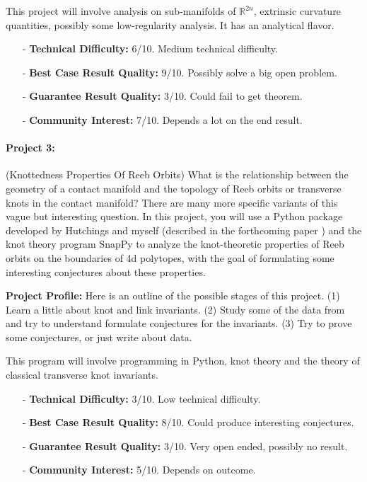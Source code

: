 \documentclass[12pt]{article}
\numberwithin{equation}{section}
\theoremstyle{definition}
\newcommand{\R}{{\mathbb R}}
\begin{document}
This project will involve analysis on sub-manifolds of $\R^{2n}$, extrinsic curvature quantities, possibly some low-regularity analysis. It has an analytical flavor.

\begin{itemize}
	\item[-] {\bf Technical Difficulty:} 6/10. Medium technical difficulty.
	\item[-] {\bf Best Case Result Quality:} 9/10. Possibly solve a big open problem.
	\item[-] {\bf Guarantee Result Quality:} 3/10. Could fail to get theorem.
	\item[-] {\bf Community Interest:} 7/10. Depends a lot on the end result.
\end{itemize}

\paragraph{Project 3:} (Knottedness Properties Of Reeb Orbits) What is the relationship between the geometry of a contact manifold and the topology of Reeb orbits or transverse knots in the contact manifold? There are many more specific variants of this vague but interesting question. In this project, you will use a Python package developed by Hutchings and myself (described in the forthcoming paper \cite{ch2018}) and the knot theory program SnapPy to analyze the knot-theoretic properties of Reeb orbits on the boundaries of 4d polytopes, with the goal of formulating some interesting conjectures about these properties.

{\bf Project Profile:} Here is an outline of the possible stages of this project. (1) Learn a little about knot and link invariants. (2) Study some of the data from \cite{ch2018} and try to understand formulate conjectures for the invariants. (3) Try to prove some conjectures, or just write about data.

This program will involve programming in Python, knot theory and the theory of classical transverse knot invariants. 

\begin{itemize}
	\item[-] {\bf Technical Difficulty:} 3/10. Low technical difficulty.
	\item[-] {\bf Best Case Result Quality:} 8/10. Could produce interesting conjectures.
	\item[-] {\bf Guarantee Result Quality:} 3/10. Very open ended, possibly no result.
	\item[-] {\bf Community Interest:} 5/10. Depends on outcome.
\end{itemize}
\end{document}
